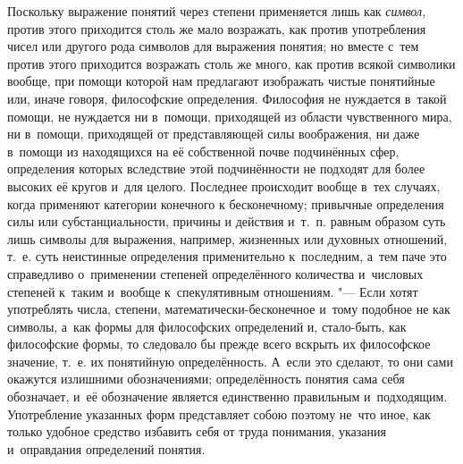 Поскольку выражение понятий через степени применяется лишь как {\em символ,}
против этого приходится столь же мало возражать, как против употребления чисел
или другого рода символов для выражения понятия; но вместе с~тем против этого
приходится возражать столь же много, как против всякой символики вообще, при
помощи которой нам предлагают изображать чистые понятийные или, иначе говоря,
философские определения. Философия не нуждается в~такой помощи, не нуждается ни
в~помощи, приходящей из области чувственного мира, ни в~помощи, приходящей от
представляющей силы воображения, ни даже в~помощи из находящихся на её
собственной почве подчинённых сфер, определения которых вследствие этой
подчинённости не подходят для более высоких её кругов и~для целого. Последнее
происходит вообще в~тех случаях, когда применяют категории конечного к
бесконечному; привычные определения силы или субстанциальности, причины и
действия и~т.~п. равным образом суть лишь символы для выражения, например,
жизненных или духовных отношений, т.~е. суть неистинные определения
применительно к~последним, а~тем паче это справедливо о~применении степеней
определённого количества и~числовых степеней к~таким и~вообще к~спекулятивным
отношениям. "--- Если хотят употреблять числа, степени,
математически-бесконечное и~тому подобное не как символы, а~как формы для
философских определений и, стало-быть, как философские формы, то следовало бы
прежде всего вскрыть их философское значение, т.~е. их понятийную
определённость. А~если это сделают, то они сами окажутся излишними
обозначениями; определённость понятия сама себя обозначает, и~её обозначение
является единственно правильным и~подходящим. Употребление указанных форм
представляет собою поэтому не~что иное, как только удобное средство избавить
себя от труда понимания, указания и~оправдания определений понятия.

\bigskip
